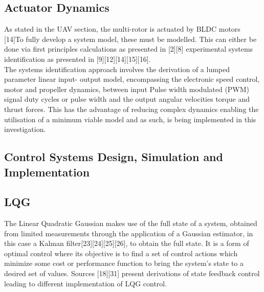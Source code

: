 \documentclass[12pt,a4paper,twoside]{report}
\begin{document}
			\subsection*{Actuator Dynamics}	
				As stated in the UAV section, the multi-rotor is actuated by BLDC motors [14]To fully develop a system model, these must be modelled. This can either be done via first principles calculations as presented in [2][8] experimental systems identification as presented in [9][12][14][15][16]. 
				\\
				The systems identification approach involves the derivation of a lumped parameter linear input- output model, encompassing the electronic speed control, motor and propeller dynamics, between input Pulse width modulated (PWM) signal duty cycles or pulse width and the output angular velocities torque and thrust forces. This has the advantage of reducing complex dynamics enabling the utilisation of a minimum viable model and as such, is being implemented in this investigation.
				
		\subsection{Control Systems Design, Simulation and Implementation}
		
			\subsection*{LQG}
				The Linear Quadratic Gaussian makes use of the full state of a system, obtained from limited measurements through the application of a Gaussian estimator, in this case a Kalman filter[23][24][25][26], to obtain the full state. It is a form of optimal control where its objective is to find a set of control actions which minimize some cost or performance function to bring the system’s state to a desired set of values. Sources [18][31] present derivations of state feedback control leading to different implementation of LQG control. 
				
\end{document}
